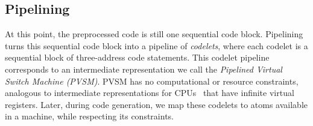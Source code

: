 \subsection{Pipelining}
\label{ss:pipelining}
At this point, the preprocessed code is still one sequential code block.
Pipelining turns this sequential code block into a pipeline of
\textit{codelets}, where each codelet is a sequential block of three-address
code statements. This codelet pipeline corresponds to an intermediate
representation we call the \textit{Pipelined Virtual Switch Machine (PVSM)}.
PVSM has no computational or resource constraints, analogous to intermediate
representations for CPUs~\cite{llvm} that have infinite virtual
registers. Later, during code generation, we map these codelets to atoms
available in a \absmachine machine, while respecting its constraints.

